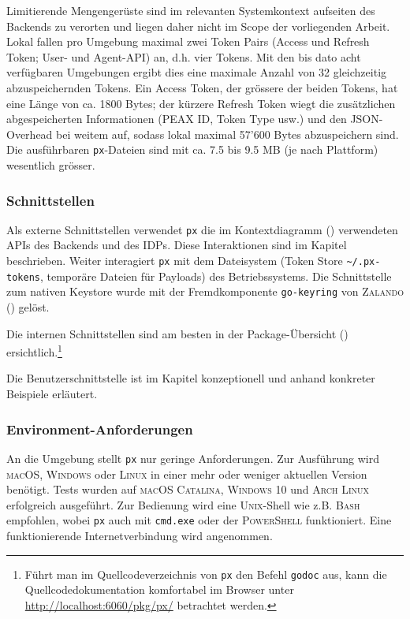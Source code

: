 Limitierende Mengengerüste sind im relevanten Systemkontext aufseiten des Backends zu verorten und liegen daher nicht im Scope der vorliegenden Arbeit. Lokal fallen pro Umgebung maximal zwei Token Pairs (Access und Refresh Token; User- und Agent-API) an, d.h. vier Tokens. Mit den bis dato acht verfügbaren Umgebungen ergibt dies eine maximale Anzahl von 32 gleichzeitig abzuspeichernden Tokens. Ein Access Token, der grössere der beiden Tokens, hat eine Länge von ca. 1800 Bytes; der kürzere Refresh Token wiegt die zusätzlichen abgespeicherten Informationen (PEAX ID, Token Type usw.) und den JSON-Overhead bei weitem auf, sodass lokal maximal 57'600 Bytes abzuspeichern sind. Die ausführbaren \texttt{px}-Dateien sind mit ca. 7.5 bis 9.5 MB (je nach Plattform) wesentlich grösser. 

\subsubsection{Schnittstellen}

Als externe Schnittstellen verwendet \texttt{px} die im Kontextdiagramm () verwendeten APIs des Backends und des IDPs. Diese Interaktionen sind im Kapitel  beschrieben. Weiter interagiert \texttt{px} mit dem Dateisystem (Token Store \texttt{\~{}/.px-tokens}, temporäre Dateien für Payloads) des Betriebssystems. Die Schnittstelle zum nativen Keystore wurde mit der Fremdkomponente \texttt{go-keyring} von \textsc{Zalando} () gelöst.

Die internen Schnittstellen sind am besten in der Package-Übersicht () ersichtlich.\footnote{Führt man im Quellcodeverzeichnis von \texttt{px} den Befehl \texttt{godoc} aus, kann die Quellcodedokumentation komfortabel im Browser unter \url{http://localhost:6060/pkg/px/} betrachtet werden.}

Die Benutzerschnittstelle ist im Kapitel  konzeptionell und anhand konkreter Beispiele erläutert. 

\subsubsection{Environment-Anforderungen}

An die Umgebung stellt \texttt{px} nur geringe Anforderungen. Zur Ausführung wird \textsc{macOS}, \textsc{Windows} oder \textsc{Linux} in einer mehr oder weniger aktuellen Version benötigt. Tests wurden auf \textsc{macOS Catalina}, \textsc{Windows 10} und \textsc{Arch Linux} erfolgreich ausgeführt. Zur Bedienung wird eine \textsc{Unix}-Shell wie z.B. \textsc{Bash} empfohlen, wobei \texttt{px} auch mit \texttt{cmd.exe} oder der \textsc{PowerShell} funktioniert. Eine funktionierende Internetverbindung wird angenommen.

